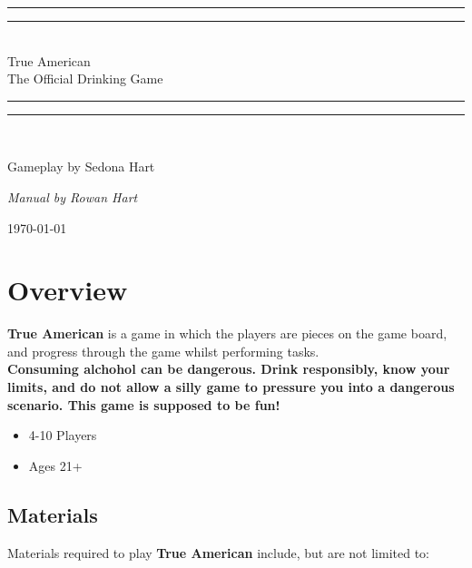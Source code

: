 \documentclass[12pt]{article}
\newlength{\drop}
\begin{document}
\begin{titlepage}
    \textheight
    \centering
    \vspace*{\baselineskip}
    \rule{\textwidth}{1.6pt}\vspace*{-\baselineskip}\vspace*{2pt}
    \rule{\textwidth}{0.4pt}\\[\baselineskip]
    {\LARGE True American \\[0.3\baselineskip] The Official Drinking Game}\\[0.2\baselineskip]
    \rule{\textwidth}{0.4pt}\vspace*{-\baselineskip}\vspace{3.2pt}
    \rule{\textwidth}{1.6pt}\\[\baselineskip]
    \scshape
    \vspace*{2\baselineskip}
    {\Large Gameplay by Sedona Hart\par}
    {\itshape Manual by Rowan Hart\par}
    \vspace*{2\baselineskip}
    {\scshape \today} \\
    \vfill
\end{titlepage}

\section{Overview} \label{overview}

\textbf{True American} is a game in which the players are pieces on the game board, and progress through the game whilst performing tasks. \\

\textbf{Consuming alchohol can be dangerous. Drink responsibly, know your limits, and do not allow a silly game to pressure you into a dangerous scenario. This game is supposed to be fun!}

\begin{itemize}
\item 4-10 Players
\item Ages 21+
\end{itemize}

\subsection{Materials}

Materials required to play \textbf{True American} include, but are not limited to: \\
\end{document}
